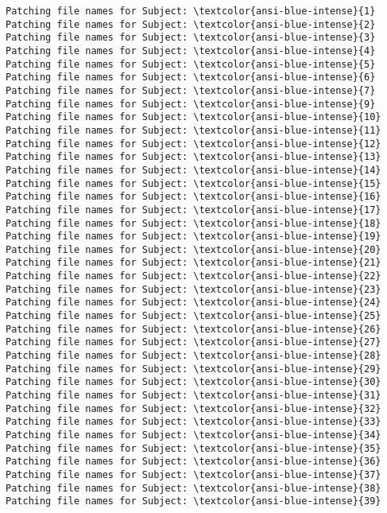 \documentclass[11pt]{article}
\begin{document}
    \begin{Verbatim}[commandchars=\\\{\}]
Patching file names for Subject: \textcolor{ansi-blue-intense}{1}
Patching file names for Subject: \textcolor{ansi-blue-intense}{2}
Patching file names for Subject: \textcolor{ansi-blue-intense}{3}
Patching file names for Subject: \textcolor{ansi-blue-intense}{4}
Patching file names for Subject: \textcolor{ansi-blue-intense}{5}
Patching file names for Subject: \textcolor{ansi-blue-intense}{6}
Patching file names for Subject: \textcolor{ansi-blue-intense}{7}
Patching file names for Subject: \textcolor{ansi-blue-intense}{9}
Patching file names for Subject: \textcolor{ansi-blue-intense}{10}
Patching file names for Subject: \textcolor{ansi-blue-intense}{11}
Patching file names for Subject: \textcolor{ansi-blue-intense}{12}
Patching file names for Subject: \textcolor{ansi-blue-intense}{13}
Patching file names for Subject: \textcolor{ansi-blue-intense}{14}
Patching file names for Subject: \textcolor{ansi-blue-intense}{15}
Patching file names for Subject: \textcolor{ansi-blue-intense}{16}
Patching file names for Subject: \textcolor{ansi-blue-intense}{17}
Patching file names for Subject: \textcolor{ansi-blue-intense}{18}
Patching file names for Subject: \textcolor{ansi-blue-intense}{19}
Patching file names for Subject: \textcolor{ansi-blue-intense}{20}
Patching file names for Subject: \textcolor{ansi-blue-intense}{21}
Patching file names for Subject: \textcolor{ansi-blue-intense}{22}
Patching file names for Subject: \textcolor{ansi-blue-intense}{23}
Patching file names for Subject: \textcolor{ansi-blue-intense}{24}
Patching file names for Subject: \textcolor{ansi-blue-intense}{25}
Patching file names for Subject: \textcolor{ansi-blue-intense}{26}
Patching file names for Subject: \textcolor{ansi-blue-intense}{27}
Patching file names for Subject: \textcolor{ansi-blue-intense}{28}
Patching file names for Subject: \textcolor{ansi-blue-intense}{29}
Patching file names for Subject: \textcolor{ansi-blue-intense}{30}
Patching file names for Subject: \textcolor{ansi-blue-intense}{31}
Patching file names for Subject: \textcolor{ansi-blue-intense}{32}
Patching file names for Subject: \textcolor{ansi-blue-intense}{33}
Patching file names for Subject: \textcolor{ansi-blue-intense}{34}
Patching file names for Subject: \textcolor{ansi-blue-intense}{35}
Patching file names for Subject: \textcolor{ansi-blue-intense}{36}
Patching file names for Subject: \textcolor{ansi-blue-intense}{37}
Patching file names for Subject: \textcolor{ansi-blue-intense}{38}
Patching file names for Subject: \textcolor{ansi-blue-intense}{39}

\end{Verbatim}
\end{document}
